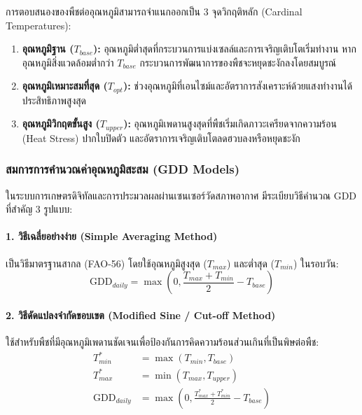 การตอบสนองของพืชต่ออุณหภูมิสามารถจำแนกออกเป็น 3 จุดวิกฤติหลัก (Cardinal Temperatures):
\begin{enumerate}
    \item \textbf{อุณหภูมิฐาน ($T_{base}$):} อุณหภูมิต่ำสุดที่กระบวนการแบ่งเซลล์และการเจริญเติบโตเริ่มทำงาน หากอุณหภูมิสิ่งแวดล้อมต่ำกว่า $T_{base}$ กระบวนการพัฒนาการของพืชจะหยุดชะงักลงโดยสมบูรณ์
    \item \textbf{อุณหภูมิเหมาะสมที่สุด ($T_{opt}$):} ช่วงอุณหภูมิที่เอนไซม์และอัตราการสังเคราะห์ด้วยแสงทำงานได้ประสิทธิภาพสูงสุด
    \item \textbf{อุณหภูมิวิกฤตขั้นสูง ($T_{upper}$):} อุณหภูมิเพดานสูงสุดที่พืชเริ่มเกิดภาวะเครียดจากความร้อน (Heat Stress) ปากใบปิดตัว และอัตราการเจริญเติบโตลดฮวบลงหรือหยุดชะงัก
\end{enumerate}

\subsubsection{สมการการคำนวณค่าอุณหภูมิสะสม (GDD Models)}

ในระบบการเกษตรดิจิทัลและการประมวลผลผ่านเซนเซอร์วัดสภาพอากาศ มีระเบียบวิธีคำนวณ GDD ที่สำคัญ 3 รูปแบบ:

\paragraph{1. วิธีเฉลี่ยอย่างง่าย (Simple Averaging Method)} เป็นวิธีมาตรฐานสากล (FAO-56) โดยใช้อุณหภูมิสูงสุด ($T_{max}$) และต่ำสุด ($T_{min}$) ในรอบวัน:
\begin{equation}
\text{GDD}_{daily} = \max\left(0, \frac{T_{max} + T_{min}}{2} - T_{base}\right)
\label{eq:gdd_simple}
\end{equation}

\paragraph{2. วิธีดัดแปลงจำกัดขอบเขต (Modified Sine / Cut-off Method)} ใช้สำหรับพืชที่มีอุณหภูมิเพดานชัดเจนเพื่อป้องกันการคิดความร้อนส่วนเกินที่เป็นพิษต่อพืช:
\begin{align}
T_{min}^* &= \max(T_{min}, T_{base}) \\
T_{max}^* &= \min(T_{max}, T_{upper}) \\
\text{GDD}_{daily} &= \max\left(0, \frac{T_{max}^* + T_{min}^*}{2} - T_{base}\right)
\label{eq:gdd_modified}
\end{align}

